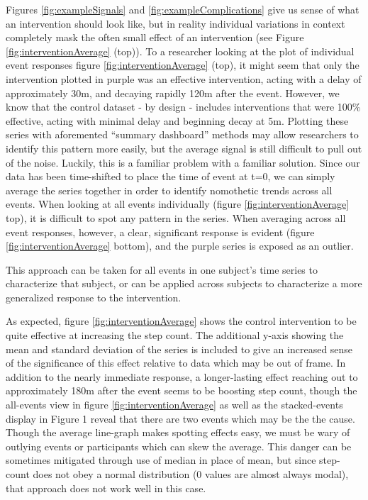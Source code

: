 Figures \ref{fig:exampleSignals} and \ref{fig:exampleComplications} give us sense of what an intervention should look like, but in reality individual variations in context completely mask the often small effect of an intervention (see Figure \ref{fig:interventionAverage} (top)).
To a researcher looking at the plot of individual event responses figure \ref{fig:interventionAverage} (top), it might seem that only the intervention plotted in purple was an effective intervention, acting with a delay of approximately 30m, and decaying rapidly 120m after the event.
However, we know that the control dataset - by design - includes interventions that were 100\% effective, acting with minimal delay and beginning decay at 5m.
Plotting these series with aforemented ``summary dashboard'' methods may allow researchers to identify this pattern more easily, but the average signal is still difficult to pull out of the noise.
Luckily, this is a familiar problem with a familiar solution.
Since our data has been time-shifted to place the time of event at t=0, we can simply average the series together in order to identify nomothetic trends across all events.
When looking at all events individually (figure \ref{fig:interventionAverage} top), it is difficult to spot any pattern in the series.
When averaging across all event responses, however, a clear, significant response is evident (figure \ref{fig:interventionAverage} bottom), and the purple series is exposed as an outlier.

This approach can be taken for all events in one subject's time series to characterize that subject, or can be applied across subjects to characterize a more generalized response to the intervention.

As expected, figure \ref{fig:interventionAverage} shows the control intervention to be quite effective at increasing the step count.
The additional y-axis showing the mean and standard deviation of the series is included to give an increased sense of the significance of this effect relative to data which may be out of frame.
In addition to the nearly immediate response, a longer-lasting effect reaching out to approximately 180m after the event seems to be boosting step count, though the all-events view in figure \ref{fig:interventionAverage} as well as the stacked-events display in Figure 1 reveal that there are two events which may be the the cause.
Though the average line-graph makes spotting effects easy, we must be wary of outlying events or participants which can skew the average.
This danger can be sometimes mitigated through use of median in place of mean, but since step-count does not obey a normal distribution (0 values are almost always modal), that approach does not work well in this case.

